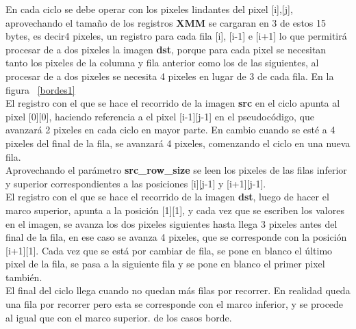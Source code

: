 En cada ciclo se debe operar con los pixeles lindantes del pixel [i],[j], aprovechando el tamaño de los registros \textbf{XMM} se cargaran en 3 de estos 15 bytes, es decir4 pixeles, un registro para cada fila [i], [i-1] e [i+1] lo que permitirá procesar de a dos pixeles la imagen \textbf{dst}, porque para cada pixel se necesitan tanto los pixeles de la columna y fila anterior como los de las siguientes, al procesar de a dos pixeles se necesita 4 pixeles en lugar de 3 de cada fila. En la figura ~\ref{bordes1}\\
El registro con el que se hace el recorrido de la imagen \textbf{src} en el ciclo apunta al pixel [0][0], haciendo referencia a el pixel [i-1][j-1] en el pseudocódigo, que avanzará 2 pixeles en cada ciclo en mayor parte. En cambio cuando se esté a 4 pixeles del final de la fila, se avanzará 4 pixeles, comenzando el ciclo en una nueva fila. \\ Aprovechando el parámetro \textbf{src_row_size} se leen los pixeles de las filas inferior y superior correspondientes a las posiciones [i][j-1] y [i+1][j-1]. \\
El registro con el que se hace el recorrido de la imagen \textbf{dst}, luego de hacer el marco superior, apunta a la posición [1][1], y cada vez que se escriben los valores en el imagen, se avanza los dos pixeles siguientes hasta llega 3 pixeles antes del final de la fila, en ese caso se  avanza 4 pixeles, que se corresponde con la posición [i+1][1].
Cada vez que se está por cambiar de fila, se pone en blanco el último pixel de la fila, se pasa a la siguiente fila y se pone en blanco el primer pixel también. \\
El final del ciclo llega cuando no quedan más filas por recorrer.
En realidad queda una fila por recorrer pero esta se corresponde con el marco inferior, y se procede al igual que con el marco superior.
de los casos borde.  \\

